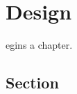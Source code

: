 \let\textcircled=\pgftextcircled
\chapter{Design}
\label{chap:design}

egins a chapter. 

\section{Section}
\label{sec:des}

